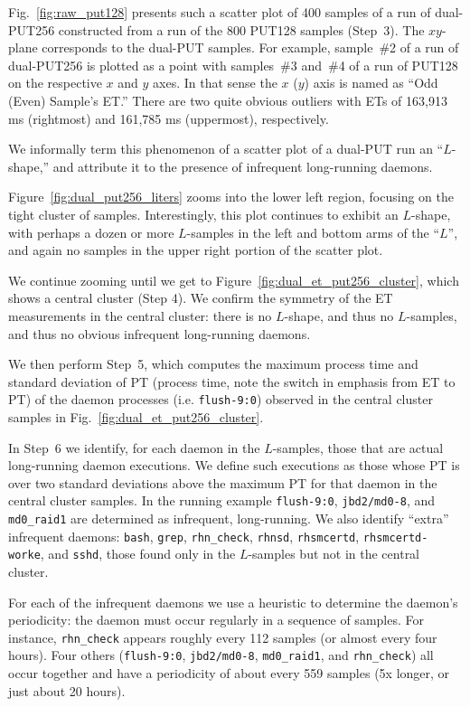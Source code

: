 \documentclass[letter]{ieice}
\begin{document}
Fig.~\ref{fig:raw_put128} presents such a scatter plot 
of 400 samples of a run of \hbox{dual-PUT256} constructed 
from a run of the 800 PUT128 samples (Step~3). 
The $xy$-plane corresponds to the dual-PUT samples. 
For example, \hbox{sample}~\#{2} of a run of dual-PUT256 
is plotted as a point with samples~\#{3} and~\#{4} of a run of PUT128 
on the respective $x$ and $y$ axes. In that sense 
the $x$ ($y$) axis is named as ``Odd (Even) Sample's ET.''
There are two quite obvious outliers with ETs 
of 163,913 ms (rightmost) and 161,785 ms (uppermost), respectively.

We informally term this phenomenon of a scatter plot of a dual-PUT run an
``$L$-shape,'' and attribute it to the
presence of infrequent long-running daemons.

Figure~\ref{fig:dual_put256_liters} zooms into the lower left region,
focusing on the
tight cluster of samples.  Interestingly, this plot continues to exhibit an
$L$-shape, with perhaps a dozen or more $L$-samples in the left and bottom arms of
the ``$L$'', and again no samples in the upper right portion of the
scatter plot.

We continue zooming until we get to Figure~\ref{fig:dual_et_put256_cluster},
which shows a central cluster (Step 4). 
We confirm the symmetry of the ET measurements in the central cluster: there
is no $L$-shape, and thus no $L$-samples, and thus no obvious infrequent
long-running daemons.

We then perform Step~5, which computes 
the maximum process time and standard deviation 
of PT (process time, note the switch in emphasis from ET to PT) of the daemon processes
(i.e. {\tt flush-9:0}) 
observed in the central cluster samples in Fig.~\ref{fig:dual_et_put256_cluster}. 

In Step~6 we identify, for each daemon in the \hbox{$L$-samples}, 
those that are actual long-running daemon
executions.  We define such executions as those whose PT 
is over two standard deviations above the maximum PT for
that daemon in the central cluster samples. 
In the running example  {\tt flush-9:0}, 
{\tt jbd2/md0-8}, and {\tt md0\_raid1} 
are determined as infrequent, \hbox{long-running}.
We also identify ``extra'' infrequent daemons: 
{\tt bash}, {\tt grep}, {\tt rhn\_check}, {\tt rhnsd}, {\tt rhsmcertd}, 
{\tt rhsmcertd-worke}, and {\tt sshd}, those 
found only in the $L$-samples but not in the central cluster. 

For each of the infrequent daemons 
we use a heuristic to determine the daemon's periodicity:
the daemon must occur regularly in a sequence of samples.
For instance, {\tt rhn\_check} appears 
roughly every 112 samples (or almost every four hours). 
Four others ({\tt flush-9:0}, {\tt jbd2/md0-8}, {\tt md0\_raid1}, and {\tt rhn\_check}) 
all occur together and have a periodicity of about every 559 samples 
(5x longer, or just about 20 hours). 
\end{document}
